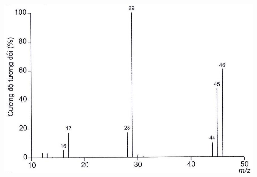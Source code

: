 \documentclass[10pt]{article}
\begin{document}
\includegraphics[max width=\textwidth, center]{2025_10_23_ae7aef68fb3b41082d29g-19(1)}
\end{document}
